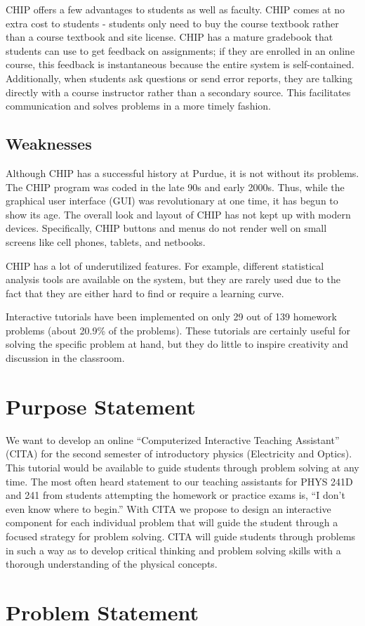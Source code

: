 CHIP offers a few advantages to students as well as faculty. CHIP comes at no extra cost to students - students only need to buy the course textbook rather than a course textbook and site license. CHIP has a mature gradebook that students can use to get feedback on assignments; if they are enrolled in an online course, this feedback is instantaneous because the entire system is self-contained. Additionally, when students ask questions or send error reports, they are talking directly with a course instructor rather than a secondary source. This facilitates communication and solves problems in a more timely fashion.

\subsection{Weaknesses}

Although CHIP has a successful history at Purdue, it is not without its problems. The CHIP program was coded in the late 90s and early 2000s. Thus, while the graphical user interface (GUI) was revolutionary at one time, it has begun to show its age. The overall look and layout of CHIP has not kept up with modern devices. Specifically, CHIP buttons and menus do not render well on small screens like cell phones, tablets, and netbooks.

CHIP has a lot of underutilized features. For example, different statistical analysis tools are available on the system, but they are rarely used due to the fact that they are either hard to find or require a learning curve.

Interactive tutorials have been implemented on only 29 out of 139 homework problems (about 20.9\% of the problems). These tutorials are certainly useful for solving the specific problem at hand, but they do little to inspire creativity and discussion in the classroom.

\section{Purpose Statement}

We want to develop an online ``Computerized Interactive Teaching Assistant'' (CITA) for the second semester of introductory physics (Electricity and Optics). This tutorial would be available to guide students through problem solving at any time. The most often heard statement to our teaching assistants for PHYS 241D and 241 from students attempting the homework or practice exams is, ``I don’t even know where to begin.''  With CITA we propose to design an interactive component for each individual problem that will guide the student through a focused strategy for problem solving.  CITA will guide students through problems in such a way as to develop critical thinking and problem solving skills with a thorough understanding of the physical concepts.

\section{Problem Statement}

